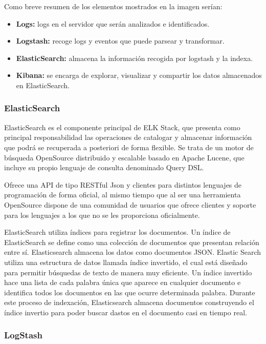 Como breve resumen de los elementos mostrados en la imagen serían:
\begin{itemize}
\item \textbf{Logs:} logs en el servidor que serán analizados e identificados.
\item \textbf{Logstash:} recoge logs y eventos que puede parsear y transformar.
\item \textbf{ElasticSearch:} almacena la información recogida por logstash y la indexa.
\item \textbf{Kibana:} se encarga de explorar, visualizar y compartir los datos almacenados en ElasticSearch.
\end{itemize}

\subsubsection{ElasticSearch}

ElasticSearch es el componente principal de ELK Stack, que presenta como principal responsabilidad las operaciones de catalogar y almacenar información que podrá se recuperada a posteriori de forma flexible. Se trata de un motor de búsqueda OpenSource distribuido y escalable basado en Apache Lucene, que incluye su propio lenguaje de consulta denominado Query DSL. 

Ofrece una API de tipo RESTful Json y clientes para distintos lenguajes de programación de forma oficial, al mismo tiempo que al ser una herramienta OpenSource dispone de una comunidad de usuarios que ofrece clientes y soporte para los lenguajes a los que no se les proporciona oficialmente.

ElasticSearch utiliza índices para registrar los documentos. Un índice de ElasticSearch se define como una colección de documentos que presentan relación entre sí. Elasticsearch almacena los datos como documentos JSON. Elastic Search utiliza una estructura de datos llamada índice invertido, el cual está diseñado para permitir búsquedas de texto de manera muy eficiente. Un índice invertido hace una lista de cada palabra única que aparece en cualquier documento e identifica todos los documentos en las que ocurre determinada palabra. Durante este proceso de indexación, Elasticsearch almacena documentos construyendo el índice invertio para poder buscar dastos en el documento casi en tiempo real.



\subsubsection{LogStash}

